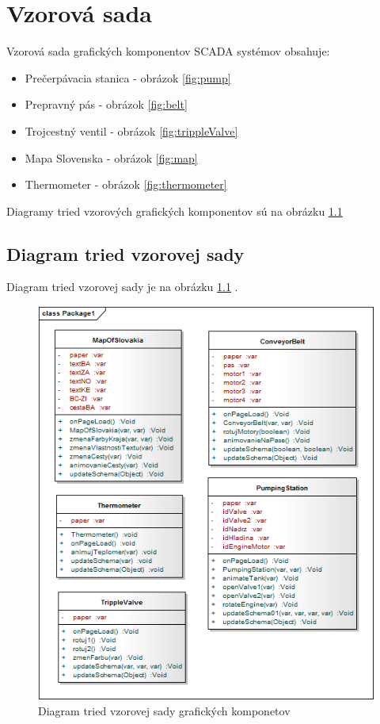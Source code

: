 \chapter{Vzorová sada}

Vzorová sada grafických komponentov SCADA systémov obsahuje:
\begin{itemize}
	\item Prečerpávacia stanica - obrázok \ref{fig:pump}
	\item Prepravný pás - obrázok \ref{fig:belt}
	\item Trojcestný ventil - obrázok \ref{fig:trippleValve}
	\item Mapa Slovenska - obrázok \ref{fig:map}
	\item Thermometer - obrázok \ref{fig:thermometer}
\end{itemize}

Diagramy tried vzorových grafických komponentov sú na obrázku \ref{fig:classD}


\section{Diagram tried vzorovej sady}
Diagram tried vzorovej sady je na obrázku \ref{fig:classD} . 
\begin{figure}[hp]
	\centering
	\includegraphics[width=0.9\linewidth]{uml/classDiagramTried.png}
	\caption{Diagram tried vzorovej sady grafických komponetov}
	\label{fig:classD}
\end{figure}


